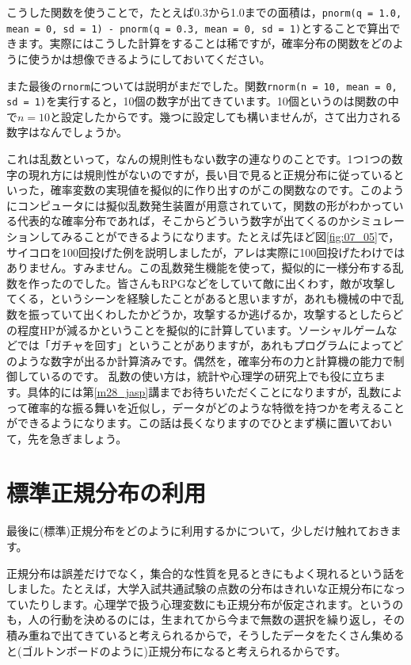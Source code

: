 \documentclass{ltjbook}
\begin{document}
こうした関数を使うことで，たとえば0.3から1.0までの面積は，\texttt{pnorm(q = 1.0, mean = 0, sd = 1) - pnorm(q = 0.3, mean = 0, sd = 1)}とすることで算出できます。実際にはこうした計算をすることは稀ですが，確率分布の関数をどのように使うかは想像できるようにしておいてください。

また最後の\texttt{rnorm}については説明がまだでした。関数\texttt{rnorm(n = 10, mean = 0, sd = 1)}を実行すると，10個の数字が出てきています。10個というのは関数の中で$n=10$と設定したからです。幾つに設定しても構いませんが，さて出力される数字はなんでしょうか。

これは乱数といって，なんの規則性もない数字の連なりのことです。1つ1つの数字の現れ方には規則性がないのですが，長い目で見ると正規分布に従っているといった，確率変数の実現値を擬似的に作り出すのがこの関数なのです。このようにコンピュータには擬似乱数発生装置が用意されていて，関数の形がわかっている代表的な確率分布であれば，そこからどういう数字が出てくるのかシミュレーションしてみることができるようになります。たとえば先ほど図\ref{fig:07_05}で，サイコロを100回投げた例を説明しましたが，アレは実際に100回投げたわけではありません。すみません。この乱数発生機能を使って，擬似的に一様分布する乱数を作ったのでした。皆さんもRPGなどをしていて敵に出くわす，敵が攻撃してくる，というシーンを経験したことがあると思いますが，あれも機械の中で乱数を振っていて出くわしたかどうか，攻撃するか逃げるか，攻撃するとしたらどの程度HPが減るかということを擬似的に計算しています。ソーシャルゲームなどでは「ガチャを回す」ということがありますが，あれもプログラムによってどのような数字が出るか計算済みです。偶然を，確率分布の力と計算機の能力で制御しているのです。
\label{randomVariablesMethod}
乱数の使い方は，統計や心理学の研究上でも役に立ちます。具体的には第\ref{m28_jasp}講までお待ちいただくことになりますが，乱数によって確率的な振る舞いを近似し，データがどのような特徴を持つかを考えることができるようになります。この話は長くなりますのでひとまず横に置いておいて，先を急ぎましょう。

\section{標準正規分布の利用}
\label{UsefulNormal}
最後に(標準)正規分布をどのように利用するかについて，少しだけ触れておきます。

正規分布は誤差だけでなく，集合的な性質を見るときにもよく現れるという話をしました。たとえば，大学入試共通試験の点数の分布はきれいな正規分布になっていたりします。心理学で扱う心理変数にも正規分布が仮定されます。というのも，人の行動を決めるのには，生まれてから今まで無数の選択を繰り返し，その積み重ねで出てきていると考えられるからで，そうしたデータをたくさん集めると(ゴルトンボードのように)正規分布になると考えられるからです。
\end{document}
